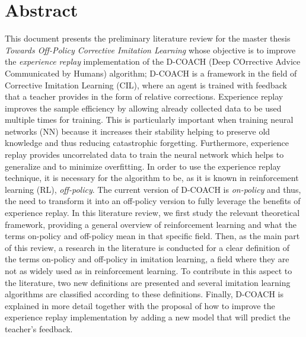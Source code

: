 \chapter*{Abstract}


This document presents the preliminary literature review for the master thesis \textit{Towards Off-Policy Corrective Imitation Learning} whose objective is to improve the \textit{experience replay} implementation of the D-COACH (Deep COrrective Advice Communicated by Humans) algorithm; D-COACH is a framework in the field of Corrective Imitation Learning (CIL), where an agent is trained with feedback that a teacher provides in the form of relative corrections. Experience replay improves the sample efficiency by allowing already collected data to be used multiple times for training.  This is particularly important when training neural networks (NN) because it increases their stability helping to preserve old knowledge and thus reducing catastrophic forgetting. Furthermore, experience replay provides uncorrelated data to train the neural network which helps to generalize and to minimize overfitting. In order to use the experience replay technique, it is necessary for the algorithm to be, as it is known in reinforcement learning (RL), \textit{off-policy}. The current version of D-COACH is \textit{on-policy} and thus, the need to transform it into an off-policy version to fully leverage the benefits of experience replay. In this literature review, we first study the relevant theoretical framework, providing a general overview of reinforcement learning and what the terms on-policy and off-policy mean in that specific field. 
Then, as the main part of this review, a research in the literature is conducted for a clear definition of the terms on-policy and off-policy in imitation learning, a field where they are not as widely used as in reinforcement learning. To contribute in this aspect to the literature, two new definitions are presented and several imitation learning algorithms are classified according to these definitions. Finally, D-COACH is explained in more detail together with the proposal of how to improve the experience replay implementation by adding a new model that will predict the teacher's feedback.


